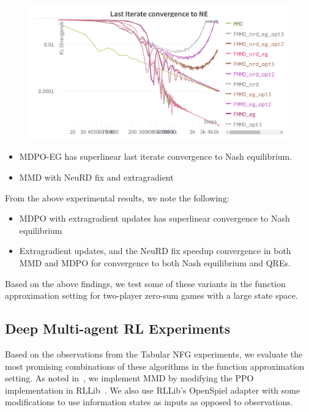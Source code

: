 \begin{figure}[H]
\end{figure}


\begin{figure}[H]
	\includegraphics[width=15cm]{plots/MMD_NE.png}
\end{figure}

\begin{itemize}
	\item{MDPO-EG has superlinear last iterate convergence to Nash
	            equilibrium.
	      }
	\item{MMD with NeuRD fix and extragradient }
\end{itemize}

From the above experimental results, we note the following:

\begin{itemize}
	\item {MDPO with extragradient updates has superlinear convergence to Nash equilibrium}
	\item {Extragradient updates, and the NeuRD fix speedup convergence in both MMD and MDPO for convergence 
	to both Nash equilibrium and QREs.}
\end{itemize}

Based on the above findings, we test some of these variants in the function approximation setting for 
two-player zero-sum games with a large state space.

\subsection{Deep Multi-agent RL Experiments}


Based on the observations from the Tabular NFG experiments, we evaluate the most promising
combinations of these algorithms in the function approximation setting.
As noted in~\cite{sokotaUnified2023}, we implement MMD by modifying the PPO
implementation in RLLib~\cite{liangRLlib2018}.
We also use RLLib's OpenSpiel adapter with some modifications to use information states as inputs
as opposed to observations.

